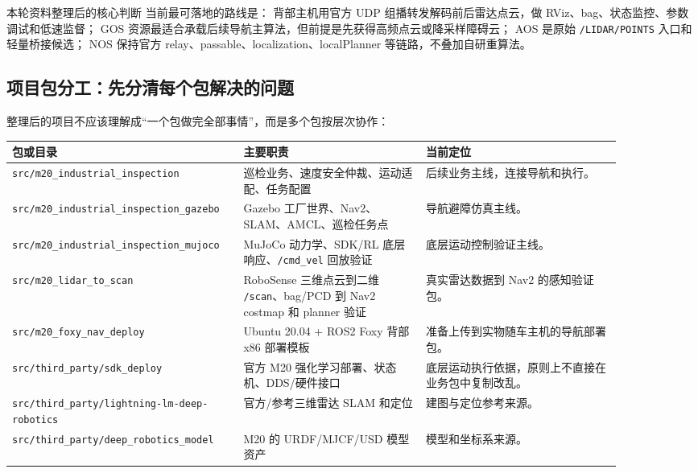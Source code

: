 \documentclass[UTF8,11pt,a4paper]{ctexart}
\begin{document}
\begin{orangebox}{本轮资料整理后的核心判断}
当前最可落地的路线是：
背部主机用官方 UDP 组播转发解码前后雷达点云，做 RViz、bag、状态监控、参数调试和低速监督；
GOS 资源最适合承载后续导航主算法，但前提是先获得高频点云或降采样障碍云；
AOS 是原始 \texttt{/LIDAR/POINTS} 入口和轻量桥接候选；
NOS 保持官方 relay、passable、localization、localPlanner 等链路，不叠加自研重算法。
\end{orangebox}

\subsection{项目包分工：先分清每个包解决的问题}

整理后的项目不应该理解成“一个包做完全部事情”，而是多个包按层次协作：

\begin{center}
\renewcommand{\arraystretch}{1.25}
\begin{tabular}{p{0.30\linewidth}p{0.28\linewidth}p{0.30\linewidth}}
\toprule
\textbf{包或目录} & \textbf{主要职责} & \textbf{当前定位}\\
\midrule
\texttt{src/m20\_industrial\_inspection} &
巡检业务、速度安全仲裁、运动适配、任务配置 &
后续业务主线，连接导航和执行。\\
\texttt{src/m20\_industrial\_inspection\_gazebo} &
Gazebo 工厂世界、Nav2、SLAM、AMCL、巡检任务点 &
导航避障仿真主线。\\
\texttt{src/m20\_industrial\_inspection\_mujoco} &
MuJoCo 动力学、SDK/RL 底层响应、\texttt{/cmd\_vel} 回放验证 &
底层运动控制验证主线。\\
\texttt{src/m20\_lidar\_to\_scan} &
RoboSense 三维点云到二维 \texttt{/scan}、bag/PCD 到 Nav2 costmap 和 planner 验证 &
真实雷达数据到 Nav2 的感知验证包。\\
\texttt{src/m20\_foxy\_nav\_deploy} &
Ubuntu 20.04 + ROS2 Foxy 背部 x86 部署模板 &
准备上传到实物随车主机的导航部署包。\\
\texttt{src/third\_party/sdk\_deploy} &
官方 M20 强化学习部署、状态机、DDS/硬件接口 &
底层运动执行依据，原则上不直接在业务包中复制改乱。\\
\texttt{src/third\_party/lightning-lm-deep-robotics} &
官方/参考三维雷达 SLAM 和定位 &
建图与定位参考来源。\\
\texttt{src/third\_party/deep\_robotics\_model} &
M20 的 URDF/MJCF/USD 模型资产 &
模型和坐标系来源。\\
\bottomrule
\end{tabular}
\end{center}
\end{document}
